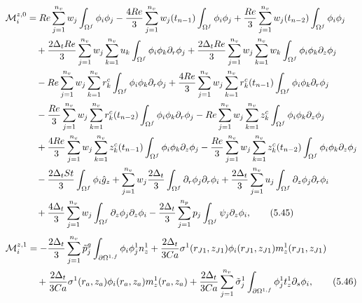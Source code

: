 \documentclass{article}
\begin{document}
\begin{align}
\mathcal{M}_i^{z,0} &= Re \sum_{j=1}^{n_v} w_j \int_{\Omega^f} \phi_i \phi_j - \frac{4Re}{3} \sum_{j=1}^{n_v} w_j(t_{n-1}) \int_{\Omega^f} \phi_i \phi_j + \frac{Re}{3} \sum_{j=1}^{n_v} w_j(t_{n-2}) \int_{\Omega^f} \phi_i \phi_j \nonumber\\
&\quad + \frac{2\Delta_t Re}{3} \sum_{j=1}^{n_v} w_j \sum_{k=1}^{n_v} u_k \int_{\Omega^f} \phi_i \phi_k \partial_r \phi_j + \frac{2\Delta_t Re}{3} \sum_{j=1}^{n_v} w_j \sum_{k=1}^{n_v} w_k \int_{\Omega^f} \phi_i \phi_k \partial_z \phi_j \nonumber\\
&\quad - Re \sum_{j=1}^{n_v} w_j \sum_{k=1}^{n_v} r_k^c \int_{\Omega^f} \phi_i \phi_k \partial_r \phi_j + \frac{4Re}{3} \sum_{j=1}^{n_v} w_j \sum_{k=1}^{n_v} r_k^c(t_{n-1}) \int_{\Omega^f} \phi_i \phi_k \partial_r \phi_j \nonumber\\
&\quad - \frac{Re}{3} \sum_{j=1}^{n_v} w_j \sum_{k=1}^{n_v} r_k^c(t_{n-2}) \int_{\Omega^f} \phi_i \phi_k \partial_r \phi_j - Re \sum_{j=1}^{n_v} w_j \sum_{k=1}^{n_v} z_k^c \int_{\Omega^f} \phi_i \phi_k \partial_z \phi_j \nonumber\\
&\quad + \frac{4Re}{3} \sum_{j=1}^{n_v} w_j \sum_{k=1}^{n_v} z_k^c(t_{n-1}) \int_{\Omega^f} \phi_i \phi_k \partial_z \phi_j - \frac{Re}{3} \sum_{j=1}^{n_v} w_j \sum_{k=1}^{n_v} z_k^c(t_{n-2}) \int_{\Omega^f} \phi_i \phi_k \partial_z \phi_j \nonumber\\
&\quad - \frac{2\Delta_t St}{3} \int_{\Omega^f} \phi_i \hat{g}_z + \sum_{j=1}^{n_v} w_j \frac{2\Delta_t}{3} \int_{\Omega^f} \partial_r \phi_j \partial_r \phi_i + \frac{2\Delta_t}{3} \sum_{j=1}^{n_v} u_j \int_{\Omega^f} \partial_z \phi_j \partial_r \phi_i \nonumber\\
&\quad + \frac{4\Delta_t}{3} \sum_{j=1}^{n_v} w_j \int_{\Omega^f} \partial_z \phi_j \partial_z \phi_i - \frac{2\Delta_t}{3} \sum_{j=1}^{n_p} p_j \int_{\Omega^f} \psi_j \partial_z \phi_i, \tag{5.45}
\end{align}
\begin{align}
\mathcal{M}_i^{z,1} &= -\frac{2\Delta_t}{3} \sum_{j=1}^{n_v} \tilde{p}_j^g \int_{\partial \Omega^{1,f}} \phi_i \phi_j^1 n_z^1 + \frac{2\Delta_t}{3Ca} \sigma^1(r_{J1},z_{J1}) \phi_i(r_{J1},z_{J1}) m_z^{1}(r_{J1},z_{J1}) \nonumber\\
&\quad + \frac{2\Delta_t}{3Ca} \sigma^1(r_a,z_a) \phi_i(r_a,z_a) m_z^{1}(r_a,z_a) + \frac{2\Delta_t}{3Ca} \sum_{j=1}^{n_v} \tilde{\sigma}_j^1 \int_{\partial \Omega^{1,f}} \phi_j^1 t_z^1 \partial_s \phi_i, \tag{5.46}
\end{align}
\end{document}
